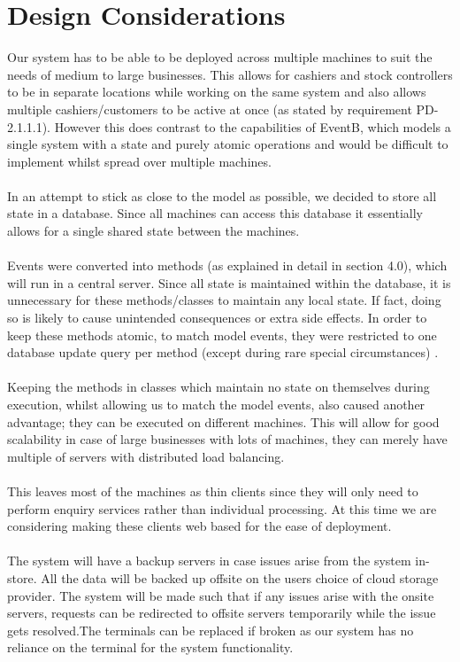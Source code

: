 \documentclass[a4paper]{article}
\begin{document}
\section{Design Considerations}
Our system has to be able to be deployed across multiple machines to suit the needs of medium to large businesses. This allows for cashiers and stock controllers to be in separate locations while working on the same system and also allows multiple cashiers/customers to be active at once (as stated by requirement PD-2.1.1.1). However this does contrast to the capabilities of EventB, which models a single system with a state and purely atomic operations and would be difficult to implement whilst spread over multiple machines.
\\\\
In an attempt to stick as close to the model as possible, we decided to store all state in a database. Since all machines can access this database it essentially allows for a single shared state between the machines.
\\\\
Events were converted into methods (as explained in detail in section 4.0), which will run in a central server. Since all state is maintained within the database, it is unnecessary for these methods/classes to maintain any local state. If fact, doing so is likely to cause unintended consequences or extra side effects. In order to keep these methods atomic, to match model events, they were restricted to one database update query per method (except during rare special circumstances) .
\\\\
Keeping the methods in classes which maintain no state on themselves during execution, whilst allowing us to match the model events, also caused another advantage; they can be executed on different machines. This will allow for good scalability in case of large businesses with lots of machines, they can merely have multiple of servers with distributed load balancing. 
\\\\
This leaves most of the machines as thin clients since they will only need to perform enquiry services rather than individual processing. At this time we are considering making these clients web based for the ease of deployment. 
\\\\
The system will have a backup servers in case issues arise from the system in-store. All the data will be backed up offsite on the users choice of cloud storage provider. The system will be made such that if any issues arise with the onsite servers, requests can be redirected to offsite servers temporarily while the issue gets resolved.The terminals can be replaced if broken as our system has no reliance on the terminal for the system functionality. 
\end{document}
